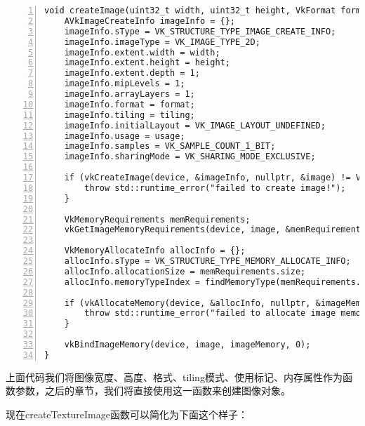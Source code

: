 \documentclass{ctexart}
\begin{document}
\begin{lstlisting}[language={[ANSI]C},keywordstyle=\color{blue!70},commentstyle=\color{red!50!green!50!blue!50},frame=shadowbox, rulesepcolor=\color{red!20!green!20!blue!20},basicstyle=\small,numbers=left, numberstyle=\tiny,breaklines=true]
void createImage(uint32_t width, uint32_t height, VkFormat format, VkImageTiling tiling, VkImageUsageFlags usage, VkMemoryPropertyFlags properties, VkImage& image, VkDeviceMemory& imageMemory) {
	AVkImageCreateInfo imageInfo = {};
	imageInfo.sType = VK_STRUCTURE_TYPE_IMAGE_CREATE_INFO;
	imageInfo.imageType = VK_IMAGE_TYPE_2D;
	imageInfo.extent.width = width;
	imageInfo.extent.height = height;
	imageInfo.extent.depth = 1;
	imageInfo.mipLevels = 1;
	imageInfo.arrayLayers = 1;
	imageInfo.format = format;
	imageInfo.tiling = tiling;
	imageInfo.initialLayout = VK_IMAGE_LAYOUT_UNDEFINED;
	imageInfo.usage = usage;
	imageInfo.samples = VK_SAMPLE_COUNT_1_BIT;
	imageInfo.sharingMode = VK_SHARING_MODE_EXCLUSIVE;

	if (vkCreateImage(device, &imageInfo, nullptr, &image) != VK_SUCCESS) {
		throw std::runtime_error("failed to create image!");
	}

	VkMemoryRequirements memRequirements;
	vkGetImageMemoryRequirements(device, image, &memRequirements);

	VkMemoryAllocateInfo allocInfo = {};
	allocInfo.sType = VK_STRUCTURE_TYPE_MEMORY_ALLOCATE_INFO;
	allocInfo.allocationSize = memRequirements.size;
	allocInfo.memoryTypeIndex = findMemoryType(memRequirements.memoryTypeBits, properties);

	if (vkAllocateMemory(device, &allocInfo, nullptr, &imageMemory) != VK_SUCCESS) {
		throw std::runtime_error("failed to allocate image memory!");
	}

	vkBindImageMemory(device, image, imageMemory, 0);
}
\end{lstlisting}

上面代码我们将图像宽度、高度、格式、tiling模式、使用标记、内存属性作为函数参数，之后的章节，我们将直接使用这一函数来创建图像对象。

现在createTextureImage函数可以简化为下面这个样子：
\end{document}
